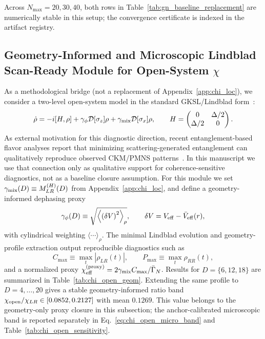 \documentclass[aps,prd,onecolumn,notitlepage,nofootinbib,superscriptaddress,11pt,floatfix]{revtex4-2}
\begin{document}
Across $N_{\max}=20,30,40$, both rows in Table~\ref{tab:gn_baseline_replacement} are numerically stable in this setup; the convergence certificate is indexed in the artifact registry.

\subsection{Geometry-Informed and Microscopic Lindblad Scan-Ready Module for Open-System \texorpdfstring{$\chi$}{chi}}
\label{app:chi_open_scan}
As a methodological bridge (not a replacement of Appendix~\ref{app:chi_loc}), we consider a two-level open-system model in the standard GKSL/Lindblad form~\cite{GKSL1976,Lindblad1976}:
\begin{equation}
\dot{\rho}=-i[H,\rho]+\gamma_\phi\mathcal{D}[\sigma_z]\rho+\gamma_{\rm mix}\mathcal{D}[\sigma_x]\rho,\qquad
H=\begin{pmatrix}0 & \Delta/2\\ \Delta/2 & 0\end{pmatrix}.
\end{equation}
As external motivation for this diagnostic direction, recent entanglement-based flavor analyses report that minimizing scattering-generated entanglement can qualitatively reproduce observed CKM/PMNS patterns~\cite{ThalerTrifinopoulos2025}. In this manuscript we use that connection only as qualitative support for coherence-sensitive diagnostics, not as a baseline closure assumption.
For this module we set $\gamma_{\rm mix}(D)\equiv M_{LR}^{(H)}(D)$ from Appendix~\ref{app:chi_loc}, and define a geometry-informed dephasing proxy
\begin{equation}
\gamma_\phi(D)\equiv \sqrt{\left\langle\left(\delta V\right)^2\right\rangle_\rho},\qquad
\delta V=V_{\rm eff}-\bar V_{\rm eff}(r),
\end{equation}
with cylindrical weighting $\langle\cdots\rangle_\rho$. The minimal Lindblad evolution and geometry-profile extraction output reproducible diagnostics such as
\begin{equation}
C_{\max}\equiv \max_t |\rho_{LR}(t)|,\qquad P_{\max}\equiv \max_t \rho_{RR}(t),
\end{equation}
and a normalized proxy $\chi_{\rm eff}^{\rm(proxy)}=2\gamma_{\rm mix}C_{\max}/\bar{\Gamma}_N$. Results for $D=\{6,12,18\}$ are summarized in Table~\ref{tab:chi_open_geom}. Extending the same profile to $D=4,\dots,20$ gives a stable geometry-informed ratio band $\chi_{\rm open}/\chi_{LR}\in[0.0852,0.2127]$ with mean $0.1269$. This value belongs to the geometry-only proxy closure in this subsection; the anchor-calibrated microscopic band is reported separately in Eq.~\eqref{eq:chi_open_micro_band} and Table~\ref{tab:chi_open_sensitivity}.
\end{document}
